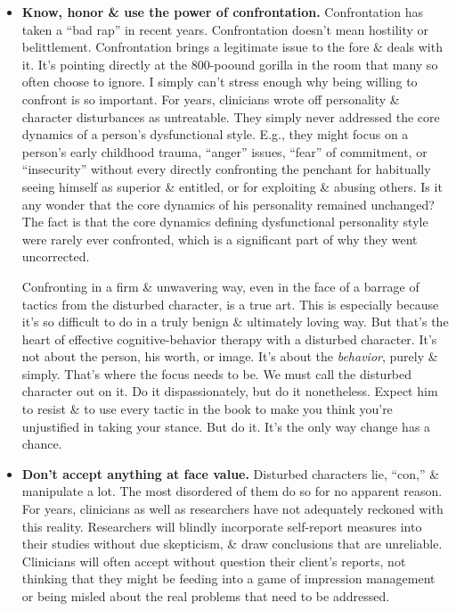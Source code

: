 \documentclass{article}
\numberwithin{equation}{section}
\begin{document}
\begin{itemize}
	\item \textbf{Know, honor \& use the power of confrontation.} Confrontation has taken a ``bad rap'' in recent years. Confrontation doesn't mean hostility or belittlement. Confrontation brings a legitimate issue to the fore \& deals with it. It's pointing directly at the 800-poound gorilla in the room that many so often choose to ignore. I simply can't stress enough why being willing to confront is so important. For years, clinicians wrote off personality \& character disturbances as untreatable. They simply never addressed the core dynamics of a person's dysfunctional style. E.g., they might focus on a person's early childhood trauma, ``anger'' issues, ``fear'' of commitment, or ``insecurity'' without every directly confronting the penchant for habitually seeing himself as superior \& entitled, or for exploiting \& abusing others. Is it any wonder that the core dynamics of his personality remained unchanged? The fact is that the core dynamics defining dysfunctional personality style were rarely ever confronted, which is a significant part of why they went uncorrected.
	
	Confronting in a firm \& unwavering way, even in the face of a barrage of tactics from the disturbed character, is a true art. This is especially because it's so difficult to do in a truly benign \& ultimately loving way. But that's the heart of effective cognitive-behavior therapy with a disturbed character. It's not about the person, his worth, or image. It's about the \textit{behavior}, purely \& simply. That's where the focus needs to be. We must call the disturbed character out on it. Do it dispassionately, but do it nonetheless. Expect him to resist \& to use every tactic in the book to make you think you're unjustified in taking your stance. But do it. It's the only way change has a chance.
	\item \textbf{Don't accept anything at face value.}  Disturbed characters lie, ``con,'' \& manipulate a lot. The most disordered of them do so for no apparent reason. For years, clinicians as well as researchers have not adequately reckoned with this reality. Researchers will blindly incorporate self-report measures into their studies without due skepticism, \& draw conclusions that are unreliable. Clinicians will often accept without question their client's reports, not thinking that they might be feeding into a game of impression management or being misled about the real problems that need to be addressed.
	

\end{itemize}
\end{document}
